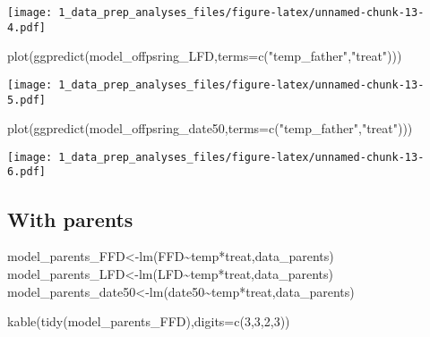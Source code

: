 \documentclass[
]{article}
\newenvironment{Shaded}{\begin{snugshade}}{\end{snugshade}}
\newcommand{\AttributeTok}[1]{\textcolor[rgb]{0.77,0.63,0.00}{#1}}
\newcommand{\DecValTok}[1]{\textcolor[rgb]{0.00,0.00,0.81}{#1}}
\newcommand{\FunctionTok}[1]{\textcolor[rgb]{0.00,0.00,0.00}{#1}}
\newcommand{\NormalTok}[1]{#1}
\newcommand{\OtherTok}[1]{\textcolor[rgb]{0.56,0.35,0.01}{#1}}
\newcommand{\SpecialCharTok}[1]{\textcolor[rgb]{0.00,0.00,0.00}{#1}}
\newcommand{\StringTok}[1]{\textcolor[rgb]{0.31,0.60,0.02}{#1}}
\begin{document}
\texttt{[image: 1\_data\_prep\_analyses\_files/figure-latex/unnamed-chunk-13-4.pdf]}

\begin{Shaded}
\begin{Highlighting}[]
\FunctionTok{plot}\NormalTok{(}\FunctionTok{ggpredict}\NormalTok{(model\_offpsring\_LFD,}\AttributeTok{terms=}\FunctionTok{c}\NormalTok{(}\StringTok{"temp\_father"}\NormalTok{,}\StringTok{"treat"}\NormalTok{)))}
\end{Highlighting}
\end{Shaded}

\texttt{[image: 1\_data\_prep\_analyses\_files/figure-latex/unnamed-chunk-13-5.pdf]}

\begin{Shaded}
\begin{Highlighting}[]
\FunctionTok{plot}\NormalTok{(}\FunctionTok{ggpredict}\NormalTok{(model\_offpsring\_date50,}\AttributeTok{terms=}\FunctionTok{c}\NormalTok{(}\StringTok{"temp\_father"}\NormalTok{,}\StringTok{"treat"}\NormalTok{)))}
\end{Highlighting}
\end{Shaded}

\texttt{[image: 1\_data\_prep\_analyses\_files/figure-latex/unnamed-chunk-13-6.pdf]}

\hypertarget{with-parents}{%
\subsection{With parents}\label{with-parents}}

\begin{Shaded}
\begin{Highlighting}[]
\NormalTok{model\_parents\_FFD}\OtherTok{\textless{}{-}}\FunctionTok{lm}\NormalTok{(FFD}\SpecialCharTok{\textasciitilde{}}\NormalTok{temp}\SpecialCharTok{*}\NormalTok{treat,data\_parents)}
\NormalTok{model\_parents\_LFD}\OtherTok{\textless{}{-}}\FunctionTok{lm}\NormalTok{(LFD}\SpecialCharTok{\textasciitilde{}}\NormalTok{temp}\SpecialCharTok{*}\NormalTok{treat,data\_parents)}
\NormalTok{model\_parents\_date50}\OtherTok{\textless{}{-}}\FunctionTok{lm}\NormalTok{(date50}\SpecialCharTok{\textasciitilde{}}\NormalTok{temp}\SpecialCharTok{*}\NormalTok{treat,data\_parents)}
\end{Highlighting}
\end{Shaded}

\begin{Shaded}
\begin{Highlighting}[]
\FunctionTok{kable}\NormalTok{(}\FunctionTok{tidy}\NormalTok{(model\_parents\_FFD),}\AttributeTok{digits=}\FunctionTok{c}\NormalTok{(}\DecValTok{3}\NormalTok{,}\DecValTok{3}\NormalTok{,}\DecValTok{2}\NormalTok{,}\DecValTok{3}\NormalTok{))}
\end{Highlighting}
\end{Shaded}
\end{document}
